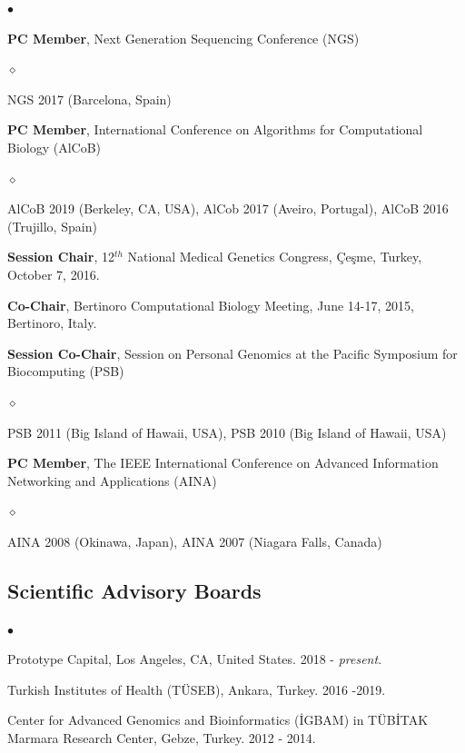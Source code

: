 \documentclass[margin,line]{res}
\newenvironment{list2}{
  \begin{list}{$\bullet$}{%
      \setlength{\itemsep}{0.1cm}
      \setlength{\parsep}{0in} \setlength{\parskip}{0in}
      \setlength{\topsep}{0in} \setlength{\partopsep}{0in} 
      \setlength{\leftmargin}{0.2in}}}{\end{list}}
\newenvironment{list3}{
  \begin{list}{$\diamond$}{%
      \setlength{\itemsep}{0in}
      \setlength{\parsep}{0.1cm} \setlength{\parskip}{0.1cm}
      \setlength{\topsep}{0.1cm} \setlength{\partopsep}{0.1cm} 
      \setlength{\leftmargin}{0.2in}}}{\end{list}}
\begin{document}
\begin{resume}
\begin{list2}
\item
  \textbf{PC Member},  Next Generation Sequencing Conference (NGS)
  \begin{list3}
  \item NGS 2017 (Barcelona, Spain)
  \end{list3}


\item
  \textbf{PC Member}, International Conference on Algorithms for Computational Biology (AlCoB)
  \begin{list3}
   \item AlCoB 2019 (Berkeley, CA, USA), AlCob 2017 (Aveiro, Portugal), AlCoB 2016 (Trujillo, Spain)
  \end{list3}
  
\item
  \textbf{Session Chair}, 12$^{th}$ National Medical Genetics Congress, Çeşme, Turkey, October 7, 2016.

\item
  \textbf{Co-Chair}, Bertinoro Computational Biology Meeting, June 14-17, 2015, Bertinoro, Italy.

\item 
  \textbf{Session Co-Chair}, Session on Personal Genomics at the Pacific Symposium for Biocomputing (PSB)
    \begin{list3}
    \item PSB 2011 (Big Island of Hawaii, USA), PSB 2010 (Big Island of Hawaii, USA)
    \end{list3}


\item
  \textbf{PC Member}, The IEEE International Conference on
  Advanced Information Networking and Applications (AINA)
  \begin{list3}
  \item AINA 2008 (Okinawa, Japan), AINA 2007 (Niagara Falls, Canada)
  \end{list3}

\end{list2}


\vspace{-0.4cm}
\subsection{\small \sc Scientific Advisory Boards}
\begin{list2}
\item
  Prototype Capital, Los Angeles, CA, United States. 2018 - {\it present}.
\item
  Turkish Institutes of Health (TÜSEB), Ankara, Turkey. 2016 -2019.
\item
  Center for Advanced Genomics and Bioinformatics (\.{I}GBAM)
  in T\"{U}B\.{I}TAK Marmara Research Center, Gebze, Turkey. 2012 - 2014.
\end{list2}


\end{resume}
\end{document}
